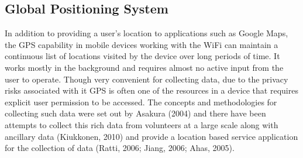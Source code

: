 \subsection{Global Positioning System}
In addition to providing a user’s location to applications such as Google Maps, the GPS capability in mobile devices working with the WiFi can maintain a continuous list of locations visited by the device over long periods of time.
It works mostly in the background and requires almost no active input from the user to operate.
Though very convenient for collecting data, due to the privacy risks associated with it GPS is often one of the resources in a device that requires explicit user permission to be accessed.
The concepts and methodologies for collecting such data were set out by Asakura (2004) and there have been attempts to collect this rich data from volunteers at a large scale along with ancillary data (Kiukkonen, 2010) and provide a location based service application for the collection of data (Ratti, 2006; Jiang, 2006; Ahas, 2005).
 
